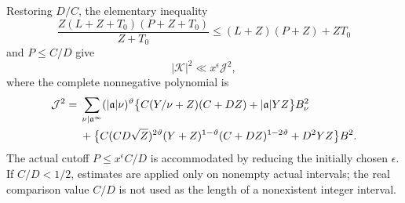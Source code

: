 Restoring $D/C$, the elementary inequality
\[
 \frac{Z(L+Z+T_0)(P+Z+T_0)}{Z+T_0}
       \le(L+Z)(P+Z)+ZT_0
\]
and $P\le C/D$ give
\[
 |\mathcal K|^2\ll x^\epsilon\mathcal J^2,
\]
where the complete nonnegative polynomial is
\begin{align}
 \mathcal J^2={}&\sum_{\nu\mid \mathfrak{a}^\infty}(|\mathfrak{a}|\nu)^\vartheta
 \bigl\{C(Y/\nu+Z)(C+DZ)+|\mathfrak{a}|YZ\bigr\}B_\nu^2
 \notag\\
 &+\bigl\{
 C(CD\sqrt Z)^{2\vartheta}(Y+Z)^{1-\vartheta}
                         (C+DZ)^{1-2\vartheta}+D^2YZ\bigr\}B^2.
 \label{ana:returned-polynomial}
\end{align}
The actual cutoff $P\le x^\epsilon C/D$ is accommodated by reducing
the initially chosen $\epsilon$. If $C/D<1/2$, estimates are applied
only on nonempty actual intervals; the real comparison value $C/D$
is not used as the length of a nonexistent integer interval.

